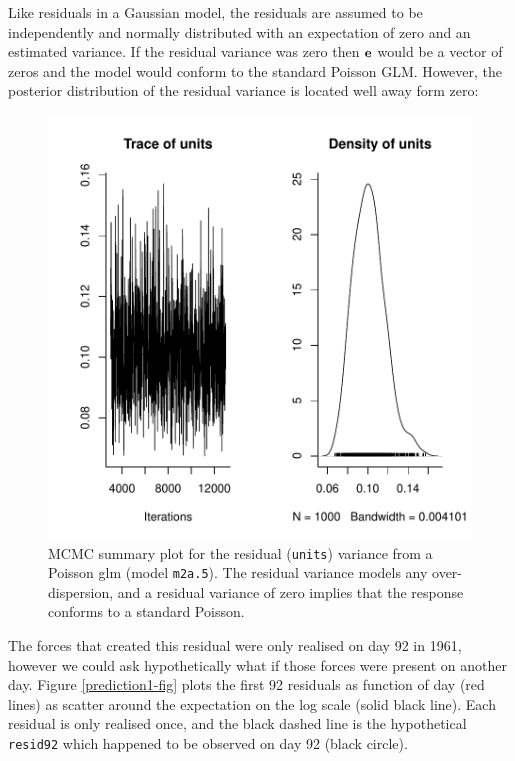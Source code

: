 \documentclass{article}
\begin{document}
 Like residuals in a Gaussian model, the residuals are assumed to be independently and normally distributed with an expectation of zero and an estimated variance.  If the residual variance was zero then ${\bf e}$ would be a vector of zeros and the model would conform to the standard Poisson GLM. However, the posterior distribution of the residual variance is located well away form zero: 

\begin{Schunk}
\end{Schunk}

\begin{figure}[!h]
\begin{center}
\includegraphics{Lecture2-023}
\end{center}
\caption{MCMC summary plot for the residual (\texttt{units})  variance from a Poisson glm (model \texttt{m2a.5}). The residual variance models any over-dispersion, and a residual variance of zero implies that the response conforms to a standard Poisson.}
\label{vcv.traffic-fig}
\end{figure}

The forces that created this residual were only realised on day 92 in 1961, however we could ask hypothetically what if those forces were present on another day. Figure \ref{prediction1-fig} plots the first 92 residuals as function of day (red lines) as scatter around the expectation on the log scale (solid black line). Each residual is only realised once, and the black dashed line is the hypothetical \texttt{resid92} which happened to be observed on day 92 (black circle).\\
\end{document}
